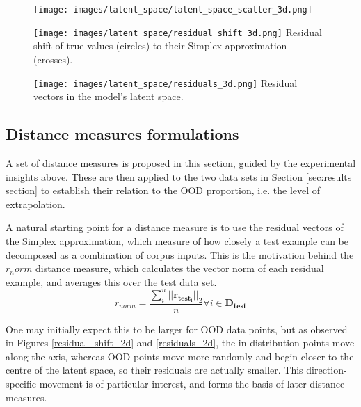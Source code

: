 \documentclass{article}
\begin{document}
\begin{figure}[h]
\centering
\begin{minipage}{.25\textwidth}
  \centering
  \texttt{[image: images/latent\_space/latent\_space\_scatter\_3d.png]}
  \label{latents_3d}
\end{minipage}%
\hspace{.05\textwidth}
\begin{minipage}{.25\textwidth}
  \centering
  \texttt{[image: images/latent\_space/residual\_shift\_3d.png]}
  {Residual shift of true values (circles) to their Simplex approximation (crosses).}
  \label{residual_shift_3d}
\end{minipage}
\begin{minipage}{.25\textwidth}
  \centering
  \texttt{[image: images/latent\_space/residuals\_3d.png]}
  {Residual vectors in the model's latent space.}
  \label{residuals_3d}
\end{minipage}
\end{figure}


\subsection{Distance measures formulations}
\label{sec:distance measures}
A set of distance measures is proposed in this section, guided by the experimental insights above. These are then applied to the two data sets in Section \ref{sec:results section} to establish their relation to the OOD proportion, i.e. the level of extrapolation.

A natural starting point for a distance measure is to use the residual vectors of the Simplex approximation, which measure of how closely a test example can be decomposed as a combination of corpus inputs. This is the motivation behind the $r_norm$ distance measure, which calculates the vector norm of each residual example, and averages this over the test data set.
\begin{equation}
\label{eq:r norm}
	r_{norm} = \frac{\sum_i^n ||\bm{r_{test_i}}||_2}{n}  \forall i  \in \bm{D_{test}}
\end{equation}

One may initially expect this to be larger for OOD data points, but as observed in Figures \ref{residual_shift_2d} and \ref{residuals_2d}, the in-distribution points move along the axis, whereas OOD points move more randomly and begin closer to the centre of the latent space, so their residuals are actually smaller. This direction-specific movement is of particular interest, and forms the basis of later distance measures.
\end{document}
